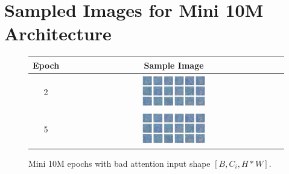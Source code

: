 \documentclass[twocolumn,superscriptaddress,aps]{revtex4-1}
\begin{document}
\section{Sampled Images for Mini 10M Architecture}
\begin{figure}[H]
\centering
\begin{tabular}{c|c}
Epoch & Sample Image \\
\hline
2 & \includegraphics[width=0.3\textwidth]{figures/10M_epoch 2.png} \\
5 & \includegraphics[width=0.3\textwidth]{figures/10M_epoch5_slightely diff_cains_bad_attention_.png} 
\end{tabular}
\caption{Mini 10M epochs with bad attention input shape $[B, C_i, H*W]$.}
\label{tab:mini_10m_bad_attention}
\end{figure}
\end{document}
